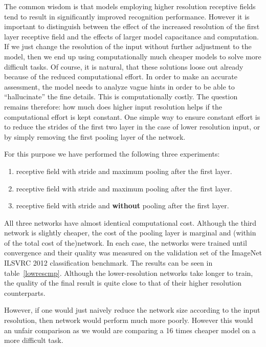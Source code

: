 \documentclass[10pt,twocolumn,letterpaper]{article}
\begin{document}
The common wisdom is that models employing higher resolution receptive
fields tend to result in significantly improved recognition performance.
However it is important to distinguish between the effect of the
increased resolution of the first layer receptive field and the
effects of larger model capacitance and computation.
If we just change the resolution of the input without further
adjustment to the model, then we end up using computationally much
cheaper models to solve more difficult tasks.
Of course, it is natural, that these solutions loose out already because of the
reduced computational effort. In order to make an accurate assessment,
the model needs to analyze vague hints in order to be able to
``hallucinate'' the fine details.
This is computationally costly. The question remains therefore: how
much does higher input resolution helps if the computational effort is
kept constant. One simple way to ensure constant effort is
to reduce the strides of the first two layer in the case of
lower resolution input, or by simply removing the first pooling layer of
the network.

For this purpose we have performed the following three experiments:
\begin{enumerate}
  \item  receptive field with stride  and maximum pooling
        after the first layer.
  \item  receptive field with stride  and maximum pooling
        after the first layer.
  \item  receptive field with stride  and {\bf without}
        pooling after the first layer.
\end{enumerate}
All three networks have almost identical computational cost. Although the third
network is slightly cheaper, the cost of the pooling layer is marginal
and (within  of the total cost of the)network.
In each case, the networks were trained until convergence and their
quality was measured on the validation set of the ImageNet ILSVRC 2012
classification benchmark. The results can be seen in table~\ref{lowrescmp}.
Although the lower-resolution networks take longer to train,
the quality of the final result is quite close to that of their
higher resolution counterparts.

However, if one would just naively reduce the network size according to the
input resolution, then network would perform much more poorly. However this
would an unfair comparison as we would are comparing a 16 times cheaper model on
a more difficult task.
\end{document}
